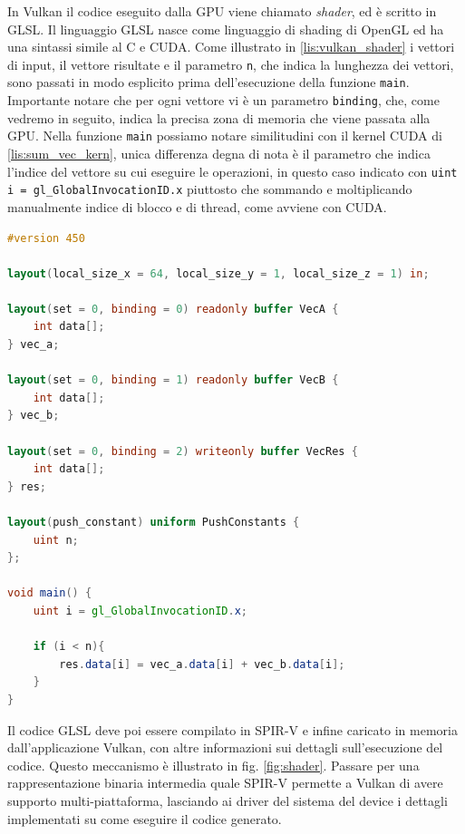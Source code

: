In Vulkan il codice eseguito dalla GPU viene chiamato \textit{shader}, ed è scritto in \gls{GLSL}. Il linguaggio GLSL nasce come linguaggio di shading di OpenGL ed ha una sintassi simile al C e CUDA. Come illustrato in \ref{lis:vulkan_shader} i vettori di input, il vettore risultate e il parametro \verb|n|, che indica la lunghezza dei vettori, sono passati in modo esplicito prima dell'esecuzione della funzione \verb|main|. Importante notare che per ogni vettore vi è un parametro \verb|binding|, che, come vedremo in seguito, indica la precisa zona di memoria che viene passata alla GPU. Nella funzione \verb|main| possiamo notare similitudini con il kernel CUDA di \ref{lis:sum_vec_kern}, unica differenza degna di nota è il parametro che indica l'indice del vettore su cui eseguire le operazioni, in questo caso indicato con \verb|uint i = gl_GlobalInvocationID.x| piuttosto che sommando e moltiplicando manualmente indice di blocco e di thread, come avviene con CUDA.

\vspace{5mm}
\begin{lstlisting}[language=GLSL, caption=Shader GLSL di somma di vettori, label=lis:vulkan_shader]
#version 450

layout(local_size_x = 64, local_size_y = 1, local_size_z = 1) in;

layout(set = 0, binding = 0) readonly buffer VecA {
    int data[];
} vec_a;

layout(set = 0, binding = 1) readonly buffer VecB {
    int data[];
} vec_b;

layout(set = 0, binding = 2) writeonly buffer VecRes {
    int data[];
} res;

layout(push_constant) uniform PushConstants {
    uint n;
};

void main() {
    uint i = gl_GlobalInvocationID.x;

    if (i < n){
        res.data[i] = vec_a.data[i] + vec_b.data[i];
    }
}    
\end{lstlisting}
\vspace{5mm}

Il codice GLSL deve poi essere compilato in SPIR-V e infine caricato in memoria dall'applicazione Vulkan, con altre informazioni sui dettagli sull'esecuzione del codice. Questo meccanismo è illustrato in fig. \ref{fig:shader}. Passare per una rappresentazione binaria intermedia quale SPIR-V permette a Vulkan di avere supporto multi-piattaforma, lasciando ai driver del sistema del device i dettagli implementati su come eseguire il codice generato.


